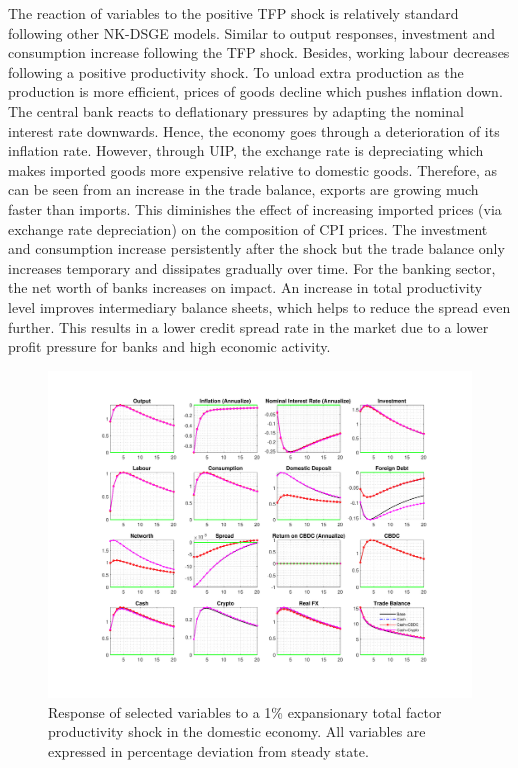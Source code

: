 \documentclass[12pt, a4paper]{article}
\begin{document}
The reaction of variables to the positive TFP shock is relatively standard following other NK-DSGE models. Similar to output responses, investment and consumption increase following the TFP shock. Besides, working labour decreases following a positive productivity shock. To unload extra production as the production is more efficient, prices of goods decline which pushes inflation down. The central bank reacts to deflationary pressures by adapting the nominal interest rate downwards. Hence, the economy goes through a deterioration of its inflation rate. However, through UIP, the exchange rate is depreciating which makes imported goods more expensive relative to domestic goods. Therefore, as can be seen from an increase in the trade balance, exports are growing much faster than imports. This diminishes the effect of increasing imported prices (via exchange rate depreciation) on the composition of CPI prices.  The investment and consumption increase persistently after the shock but the trade balance only increases temporary and dissipates gradually over time. For the banking sector, the net worth of banks increases on impact. An increase in total productivity level improves intermediary balance sheets, which helps to reduce the spread even further. This results in a lower credit spread rate in the market due to a lower profit pressure for banks and high economic activity.



\begin{figure}[H]
    \hspace{-0.7cm}
	\centering
	\centerline{\includegraphics[trim = 0mm 23mm 0mm 18mm, clip, scale=0.97]{TFP_cashvs.pdf}}
	\caption{Response of selected variables to a 1\% expansionary total factor productivity shock in the domestic economy. All variables are expressed in percentage deviation from steady state.}
	\label{TFP}
\end{figure}
\end{document}

